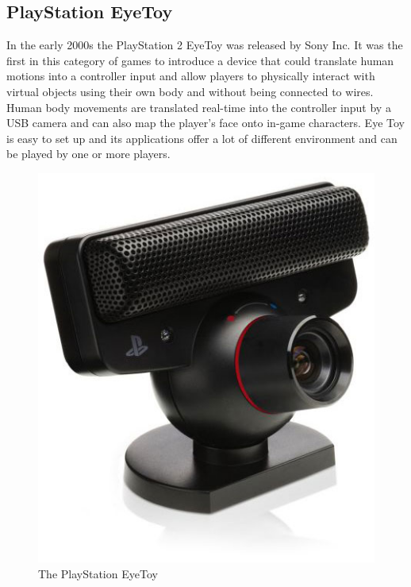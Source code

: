 \subsection{PlayStation EyeToy}
In the early 2000s the PlayStation 2 EyeToy was released by Sony Inc. It was the first in this category of games to introduce a device that could translate human motions into a controller input and allow players to physically interact with virtual objects using their own body and without being connected to wires. Human body movements are translated real-time into the controller input by a USB camera  and can also map the player’s face onto in-game characters. Eye Toy is easy to set up and its applications offer a lot of different environment and can be played by one or more players. \cite{eyetoy}
\begin{figure}[h!]
\begin{center}
\includegraphics[scale=0.3]{pseyetoy}
\caption[PlayStation EyeToy]{The PlayStation EyeToy}
\label{fig:PSEyetoy}
\end{center}
\end{figure}

